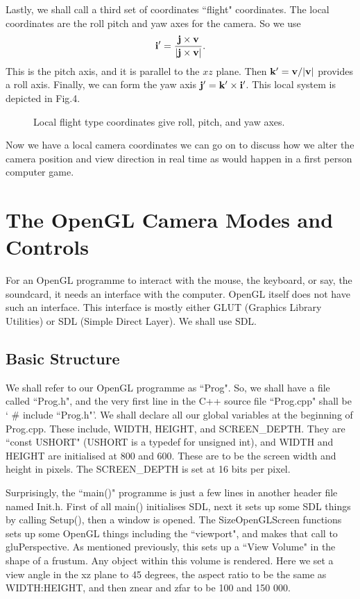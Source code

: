 \documentclass[12pt]{article}
\begin{document}
Lastly, we shall call a third set of coordinates ``flight" coordinates.
The local coordinates are the roll pitch and yaw axes for the camera.
So we use
\begin{equation}
{\bf i}^\prime=\frac{ {\bf j} \times {\bf v}} 
{\vert {\bf j} \times  {\bf v} \vert}.
\end{equation}
This is the pitch axis, and it is parallel to the $xz$ plane.
Then ${\bf k}^\prime={\bf v} / \vert {\bf v} \vert$ provides
a roll axis. Finally, we can form the 
yaw axis ${\bf j}^\prime={\bf k}^\prime \times {\bf i}^\prime$.
This local system is depicted in Fig.4.
\begin{figure}[htb]
\vspace*{10cm}
\caption{ 
Local flight type coordinates give roll, pitch, and yaw axes.
}
\end{figure}
Now we have a local camera coordinates we can go on to discuss
how we alter the camera position and view direction in real time
as would happen in a first person computer game.
 

\section{The OpenGL Camera Modes and  Controls}

For an OpenGL programme to interact with the mouse, the 
keyboard, or say, the soundcard, it needs an interface with 
the computer.
OpenGL itself does not have such an interface.
This interface is mostly either GLUT (Graphics Library 
Utilities) or SDL (Simple Direct Layer). We shall use SDL. 

\subsection{Basic Structure}

We shall  refer to our OpenGL programme as ``Prog". So,
we shall have a file called ``Prog.h", and the very first
line in the C++ source file ``Prog.cpp" shall be ` \# include ``Prog.h"'.
 We shall declare all our
global variables at the beginning of Prog.cpp. 
These include, WIDTH,  HEIGHT, and SCREEN\_DEPTH.
They are ``const USHORT" (USHORT is a typedef for unsigned int), and 
WIDTH and HEIGHT are initialised
at 800 and 600. These are to be the screen width and
height in pixels. The SCREEN\_DEPTH is set at 16 bits per pixel.

Surprisingly, the ``main()" programme is just a few lines
in another header file  named Init.h. First of all main() initialises
SDL, next  it sets up some SDL things by calling Setup(), 
then a window is opened. The SizeOpenGLScreen functions
sets up some OpenGL things including the ``viewport",
 and makes that  call to gluPerspective.  As mentioned previously,
this sets up a 
 ``View Volume" in the shape of a frustum.
Any object within this volume  is rendered. Here we set
 a view angle in the xz plane to 45 degrees, the aspect ratio
 to be the same as WIDTH:HEIGHT,
and then znear and zfar to be 100 and 150 000.
\end{document}
